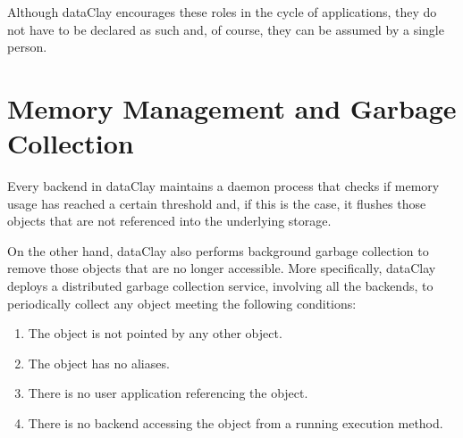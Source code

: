Although dataClay encourages these roles in the cycle of applications, they do not have to be declared as such and, of course, they can be assumed by a single person.

\section{Memory Management and Garbage Collection}
\label{sec:GarbageCollection}

Every backend in dataClay maintains a daemon process that checks if memory usage has reached a certain threshold and, if this is the case, it flushes those objects that are not referenced into the underlying storage.

On the other hand, dataClay also performs background garbage collection to remove those objects that are no longer accessible. More specifically, dataClay deploys a distributed garbage collection service, involving all the backends, to periodically collect any object meeting the following conditions:
\begin{enumerate}
  \item The object is not pointed by any other object.
  \item The object has no aliases.
  \item There is no user application referencing the object.
  \item There is no backend accessing the object from a running execution method.
\end{enumerate}

